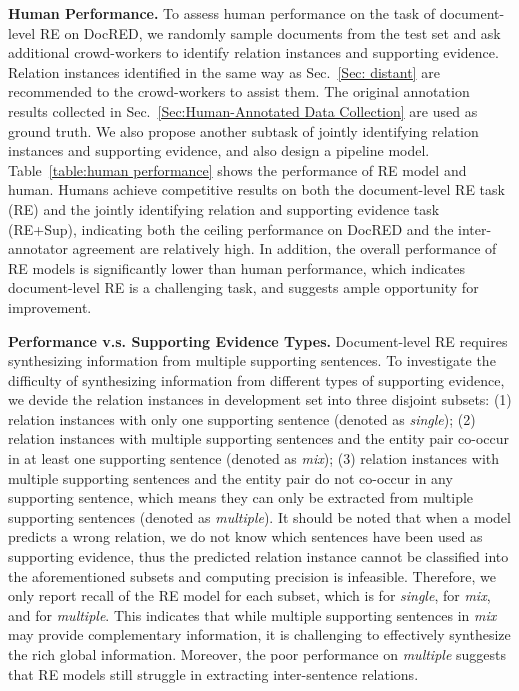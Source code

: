 \documentclass[11pt,a4paper]{article}
\begin{document}
\smallskip
\noindent
\textbf{Human Performance.}
To assess human performance on the task of document-level RE on DocRED, we randomly sample  documents from the test set and ask additional crowd-workers to identify relation instances and supporting evidence. Relation instances identified in the same way as Sec.~\ref{Sec: distant} are recommended to the crowd-workers to assist them. 
The original annotation results collected in Sec.~\ref{Sec:Human-Annotated Data Collection} are used as ground truth. We also propose another subtask of jointly identifying relation instances and supporting evidence, and also design a pipeline model.
Table~\ref{table:human performance} shows the performance of RE model and human. Humans achieve competitive results on both the document-level RE task (RE) and the jointly identifying relation and supporting evidence task (RE+Sup), indicating both the ceiling performance on DocRED and the inter-annotator agreement are relatively high. In addition, the overall performance of RE models is significantly lower than human performance, which indicates document-level RE is a challenging task, and suggests ample opportunity for improvement.



\smallskip
\noindent
\textbf{Performance v.s. Supporting Evidence Types.}
Document-level RE requires synthesizing information from multiple supporting sentences. To investigate the difficulty of synthesizing information from different types of supporting evidence, we devide the  relation instances in development set into three disjoint subsets: (1)  relation instances with only one supporting sentence (denoted as \textit{single}); (2)  relation instances with multiple supporting sentences and the entity pair co-occur in at least one supporting sentence (denoted as \textit{mix}); (3)  relation instances with multiple supporting sentences and the entity pair do not co-occur in any supporting sentence, which means they can only be extracted from multiple supporting sentences (denoted as \textit{multiple}).
It should be noted that when a model predicts a wrong relation, we do not know which sentences have been used as supporting evidence, thus the predicted relation instance cannot be classified into the aforementioned subsets and computing precision is infeasible. Therefore, we only report recall of the RE model for each subset, which is  for \textit{single},  for \textit{mix}, and  for \textit{multiple}. This indicates that while multiple supporting sentences in \textit{mix} may provide complementary information, it is challenging to effectively synthesize the rich global information. Moreover, the poor performance on \textit{multiple} suggests that RE models still struggle in extracting inter-sentence relations.
\end{document}
